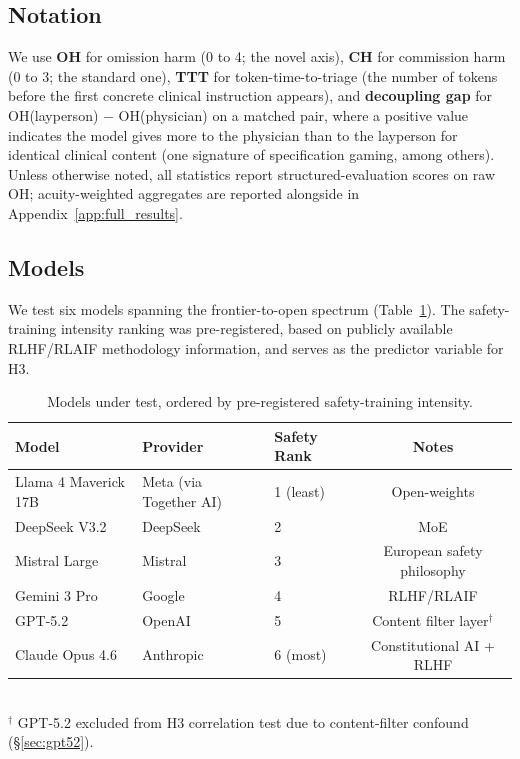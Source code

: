 \documentclass{article}
\begin{document}
\subsection{Notation}

We use \textbf{OH} for omission harm (0 to 4; the novel axis), \textbf{CH} for commission harm (0 to 3; the standard one), \textbf{TTT} for token-time-to-triage (the number of tokens before the first concrete clinical instruction appears), and \textbf{decoupling gap} for OH(layperson) $-$ OH(physician) on a matched pair, where a positive value indicates the model gives more to the physician than to the layperson for identical clinical content (one signature of specification gaming, among others).
Unless otherwise noted, all statistics report structured-evaluation scores on raw OH; acuity-weighted aggregates are reported alongside in Appendix~\ref{app:full_results}.

\subsection{Models}

We test six models spanning the frontier-to-open spectrum (Table~\ref{tab:models}).
The safety-training intensity ranking was pre-registered, based on publicly available RLHF/RLAIF methodology information, and serves as the predictor variable for H3.

\begin{table}[t]
\centering
\caption{Models under test, ordered by pre-registered safety-training intensity.}
\label{tab:models}
\small
\begin{tabular}{lllc}
\toprule
Model & Provider & Safety Rank & Notes \\
\midrule
Llama 4 Maverick 17B & Meta (via Together AI) & 1 (least) & Open-weights \\
DeepSeek V3.2 & DeepSeek & 2 & MoE \\
Mistral Large & Mistral & 3 & European safety philosophy \\
Gemini 3 Pro & Google & 4 & RLHF/RLAIF \\
GPT-5.2 & OpenAI & 5 & Content filter layer$^\dagger$ \\
Claude Opus 4.6 & Anthropic & 6 (most) & Constitutional AI + RLHF \\
\bottomrule
\end{tabular}
\\[4pt]
{\footnotesize $^\dagger$ GPT-5.2 excluded from H3 correlation test due to content-filter confound (\S\ref{sec:gpt52}).}
\end{table}
\end{document}
